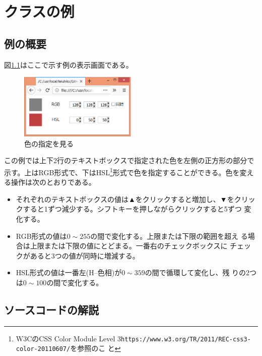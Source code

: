 \chapter{クラスの例}
\section{例の概要}
図\ref{color}はここで示す例の表示画面である。
\begin{figure}[ht]
 \begin{center}
  \includegraphics[width=0.5\textwidth]{13Ex.eps}
 \end{center}
 \caption{色の指定を見る}\label{color}
\end{figure}

この例では上下2行のテキストボックスで指定された色を左側の正方形の部分で
示す。上はRGB形式で、下はHSL\footnote{W3CのCSS Color Module Level
3\texttt{https://www.w3.org/TR/2011/REC-css3-color-20110607/}を参照のこ
と}形式で色を指定することができる。色を変える操作は次のとおりである。
\begin{itemize}
 \item それぞれのテキストボックスの値は▲をクリックすると増加し、▼をクリッ
       クすると1ずつ減少する。シフトキーを押しながらクリックすると5ずつ
       変化する。
 \item RGB形式の値は$0\sim255$の間で変化する。上限または下限の範囲を超え
       る場合は上限または下限の値にとどまる。一番右のチェックボックスに
       チェックがあると3つの値が同時に増減する。
 \item HSL形式の値は一番左(H--色相)が$0\sim359$の間で循環して変化し、残
       りの2つは$0\sim100$の間で変化する。
\end{itemize}
\section{ソースコードの解説}
